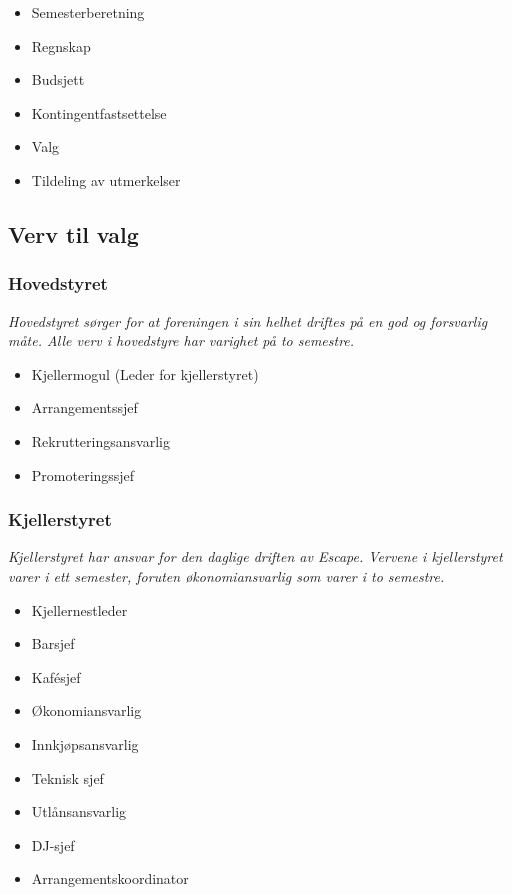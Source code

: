 \documentclass[12pt, norsk, a4paper]{proc}
\providecommand{\tightlist}{%
  \setlength{\itemsep}{0pt}\setlength{\parskip}{0pt}}
\begin{document}
\begin{itemize}
\tightlist
\item
  Semesterberetning
\item
  Regnskap
\item
  Budsjett
\item
  Kontingentfastsettelse
\item
  Valg
\item
  Tildeling av utmerkelser
\end{itemize}

\hypertarget{verv-til-valg}{%
\subsection*{Verv til valg}\label{verv-til-valg}}

\hypertarget{hovedstyret}{%
\subsubsection*{Hovedstyret}\label{hovedstyret}}

\emph{Hovedstyret sørger for at foreningen i sin helhet driftes på en
god og forsvarlig måte. Alle verv i hovedstyre har varighet på to
semestre.}

\begin{itemize}
\tightlist
\item
  Kjellermogul (Leder for kjellerstyret)
\item
  Arrangementssjef
\item
  Rekrutteringsansvarlig
\item
  Promoteringssjef
\end{itemize}

\hypertarget{kjellerstyret}{%
\subsubsection*{Kjellerstyret}\label{kjellerstyret}}

\emph{Kjellerstyret har ansvar for den daglige driften av Escape.
Vervene i kjellerstyret varer i ett semester, foruten økonomiansvarlig 
som varer i to semestre.}

\begin{itemize}
\tightlist
\item
  Kjellernestleder
\item
  Barsjef
\item
  Kafésjef
\item
  Økonomiansvarlig %
\item
  Innkjøpsansvarlig
\item
  Teknisk sjef
\item
  Utlånsansvarlig
\item
  DJ-sjef
\item
  Arrangementskoordinator
\end{itemize}
\end{document}
